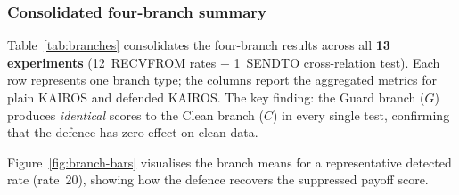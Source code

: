 \documentclass[10pt,twocolumn]{article}
\begin{document}
\subsubsection{Consolidated four-branch summary}

Table~\ref{tab:branches} consolidates the four-branch results across all
\textbf{13 experiments} (12~RECVFROM rates + 1~SENDTO cross-relation test).
Each row represents one branch type; the columns report the aggregated
metrics for plain KAIROS and defended KAIROS.  The key finding: the Guard
branch ($G$) produces \emph{identical} scores to the Clean branch ($C$) in
every single test, confirming that the defence has zero effect on clean data.

\begin{table}[!t]
\centering
\caption{Consolidated four-branch summary across 13 experiments
(12 RECVFROM rates: 1, 2, 3, 4, 6, 8, 10, 15, 20, 30, 50, 100
+ rate~20 SENDTO).
``Plain KAIROS'' is the base detector without the defence layer.
``KAIROS + Defence'' adds the role-anchored update authorisation.
Both systems process the same events; only memory-update decisions differ.
Queue alerts are identical across all branches (5~windows: 4~TP + 1~FP)
because the defence is complementary (OR gate) and never removes a KAIROS
alert.  \textbf{Clean effect $= 0.0000$} in every one of the 13 tests.}
\label{tab:branches}
\end{table}

Figure~\ref{fig:branch-bars} visualises the branch means for a
representative detected rate (rate~20), showing how the defence recovers
the suppressed payoff score.
\end{document}
